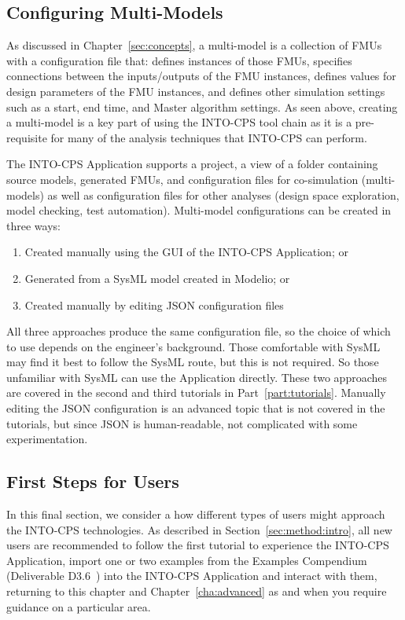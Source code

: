 \subsection{Configuring Multi-Models}

As discussed in Chapter~\ref{sec:concepts}, a multi-model  is a collection of FMUs with a configuration file that: defines instances of those FMUs, specifies connections between the inputs/outputs of the FMU instances, defines values for design parameters of the FMU instances, and defines other simulation settings such as a start, end time, and Master algorithm settings. As seen above, creating a multi-model is a key part of using the INTO-CPS tool chain as it is a pre-requisite for many of the analysis techniques that INTO-CPS can perform.

The INTO-CPS Application supports a project, a view of a folder containing source models, generated FMUs, and configuration files for co-simulation (multi-models) as well as configuration files for other analyses (design space exploration, model checking, test automation). Multi-model configurations can be created in three ways:

\begin{enumerate}[noitemsep]
  \item Created manually using the GUI of the INTO-CPS Application; or
  \item Generated from a SysML model created in Modelio; or
  \item Created manually by editing JSON configuration files
\end{enumerate}

All three approaches produce the same configuration file, so the choice of which to use depends on the engineer's background. Those comfortable with SysML may find it best to follow the SysML route, but this is not required. So those unfamiliar with SysML can use the Application directly.
These two approaches are covered in the second and third tutorials in Part~\ref{part:tutorials}. Manually editing the JSON configuration is an advanced topic that is not covered in the tutorials, but since JSON is human-readable, not complicated with some experimentation.

\subsection{First Steps for Users}
\label{sec:firststeps}
In this final section, we consider a how different types of users might approach the INTO-CPS technologies. As described in Section~\ref{sec:method:intro}, all new users are recommended to follow the first tutorial to experience the INTO-CPS Application, import one or two examples from the Examples Compendium (Deliverable D3.6~\cite{INTOCPSD3.6}) into the INTO-CPS Application and interact with them, returning to this chapter and Chapter~\ref{cha:advanced} as and when you require guidance on a particular area.


